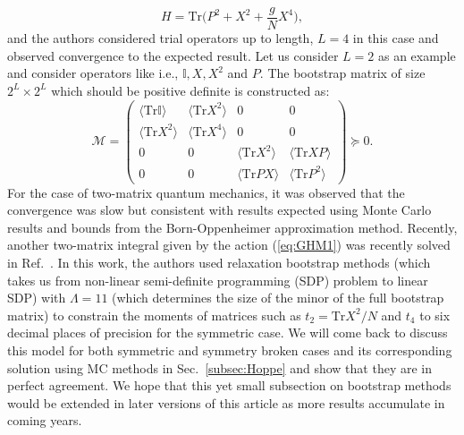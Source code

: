 \documentclass[letter,11pt]{article}
\begin{document}
\begin{equation}
H = \mbox{Tr} \Big( P^2 + X^2 + \frac{g}{N} X^4 \Big),
\end{equation}
and the authors considered trial operators up to length, $L = 4$ in this case 
and observed convergence to the expected result. 
Let us consider $L=2$ as an example and consider operators like 
i.e., $\mathbb{I}, X, X^{2}$ and $P$. The bootstrap matrix
of size $2^L \times 2^L$ 
which should be positive definite is constructed as:
\begin{equation}
	\mathcal{M} = 
	\begin{pmatrix}
		\langle \mbox{Tr}\mathbb{I} \rangle & \langle \mbox{Tr} X^2 \rangle & 0 & 0 \\
		\langle \mbox{Tr} X^2 \rangle & \langle \mbox{Tr} X^4 \rangle  & 0 & 0 \\ 
		0 & 0 & \langle \mbox{Tr} X^2 \rangle & \langle \mbox{Tr} XP \rangle \\
		0 & 0  & \langle \mbox{Tr} PX \rangle & \langle \mbox{Tr} P^2 \rangle
	\end{pmatrix}  \succeq 0. 
\end{equation}
For the case of two-matrix quantum mechanics, it was observed that the convergence
was slow but consistent with results expected using Monte Carlo results and bounds from the Born-Oppenheimer approximation method. Recently, another two-matrix integral given by the action (\ref{eq:GHM1}) was recently solved in Ref.~\cite{Kazakov:2021lel}. 
In this work, the authors used relaxation bootstrap methods (which takes us 
from non-linear semi-definite programming (SDP) problem to linear SDP) with
$\Lambda=11$ (which determines the size of the minor of the full bootstrap matrix) 
to constrain the moments of matrices such as $t_{2} = \mathrm{Tr}X^2/N$ and $t_{4}$ 
to six decimal places of precision for the symmetric case. We will come back to 
discuss this model for both symmetric and symmetry broken cases 
and its corresponding solution using MC methods in Sec.~\ref{subsec:Hoppe} 
and show that they are in perfect agreement. 
We hope that this yet small subsection on bootstrap methods would be extended in later 
versions of this article as more results accumulate in coming years. 
 
\end{document}
